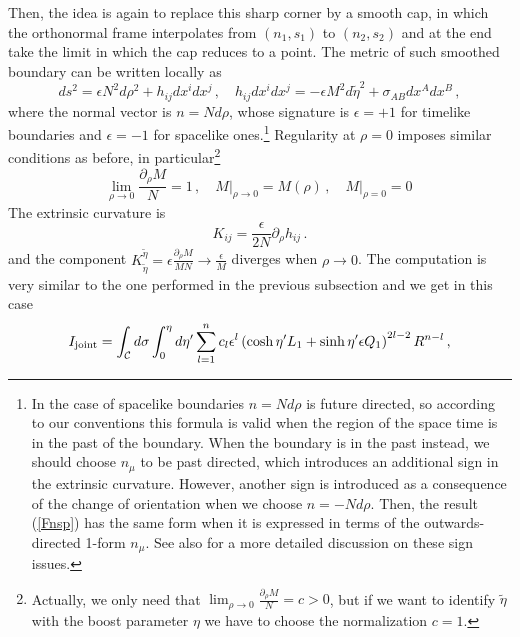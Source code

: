 \documentclass[11pt,letterpaper]{article}
\begin{document}
Then, the idea is again to replace this sharp corner by a smooth cap, in which the orthonormal frame interpolates from $(n_1, s_1)$ to $(n_2, s_2)$ and at the end take the limit in which the cap reduces to a point. The metric of such smoothed boundary can be written locally as
\begin{equation}
ds^2=\epsilon N^2d\rho^2+h_{ij}dx^idx^j\, ,\quad h_{ij}dx^idx^j=-\epsilon M^2 d\tilde\eta^2+\sigma_{AB}dx^{A}dx^{B}\, ,
\end{equation}
where the normal vector is $n=N d\rho$, whose signature is $\epsilon=+1$ for timelike boundaries and $\epsilon=-1$ for spacelike ones.\footnote{In the case of spacelike boundaries $n=Nd\rho$ is future directed, so according to our conventions this formula is valid when the region of the space time is in the past of the boundary. When the boundary is in the past instead, we should choose $n_{\mu}$ to be past directed, which introduces an additional sign in the extrinsic curvature. However, another sign is introduced as a consequence of the change of orientation when we choose $n=-N d\rho$. Then, the result (\ref{Fnsp}) has the same form when it is expressed in terms of the outwards-directed 1-form $n_{\mu}$. See also \cite{Jee1984,10.2307/44237512,birman1984,Lehner:2016vdi} for a more detailed discussion on these sign issues.} Regularity at $\rho=0$ imposes similar conditions as before, in particular\footnote{Actually, we only need that $\lim_{\rho\rightarrow 0}\frac{\partial_{\rho} M}{N}=c>0$, but if we want to identify $\tilde\eta$ with the boost parameter $\eta$ we have to choose the normalization $c=1$. } 
\begin{equation}
\lim_{\rho\rightarrow 0}\frac{\partial_{\rho} M}{N}=1\, , \quad M\Big|_{\rho\rightarrow 0} =M(\rho)\, , \quad M\Big|_{\rho= 0} =0\,
\end{equation}
The extrinsic curvature is
\begin{equation}
K_{ij}=\frac{\epsilon}{2N}\partial_{\rho} h_{ij}\, .
\end{equation}
and the component $K^{\tilde \eta}_{\tilde \eta}=\epsilon\frac{\partial_{\rho} M}{M N}\rightarrow \frac{\epsilon}{M}$ diverges when $\rho\rightarrow 0$. The computation is very similar to the one performed in the previous subsection and we get in this case
\begin{equation}
I_{\rm joint}=\int_{\mathcal{C}}d\sigma \int_{0}^{\eta} d\eta' \sum_{l=1}^{n}c_l \epsilon^{l} \left(\cosh \eta' L_1+\sinh \eta'  \epsilon Q_1\right)^{2l-2}R^{n-l}\, ,
\end{equation}
\end{document}
